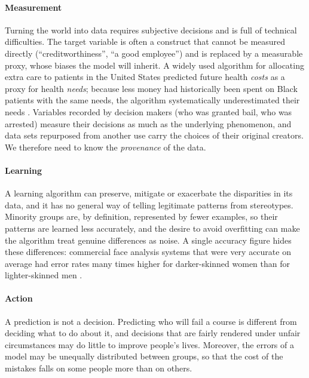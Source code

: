 \paragraph{Measurement} Turning the world into data requires subjective decisions and is full of
technical difficulties. The target variable is often a construct that cannot be measured
directly (``creditworthiness'', ``a good employee'') and is replaced by a measurable proxy,
whose biases the model will inherit. A widely used algorithm for allocating extra care to
patients in the United States predicted future health \emph{costs} as a proxy for health
\emph{needs}; because less money had historically been spent on Black patients with the same
needs, the algorithm systematically underestimated their needs \citep{obermeyer2019dissecting}.
Variables recorded by decision makers (who was granted bail, who was arrested) measure their
decisions as much as the underlying phenomenon, and data sets repurposed from another use carry
the choices of their original creators. We therefore need to know the \emph{provenance} of the data.

\paragraph{Learning} A learning algorithm can preserve, mitigate or exacerbate the disparities in
its data, and it has no general way of telling legitimate patterns from stereotypes. Minority
groups are, by definition, represented by fewer examples, so their patterns are learned less
accurately, and the desire to avoid overfitting can make the algorithm treat genuine differences
as noise. A single accuracy figure hides these differences: commercial face analysis systems
that were very accurate on average had error rates many times higher for darker-skinned women
than for lighter-skinned men \citep{buolamwini2018gender}.

\paragraph{Action} A prediction is not a decision. Predicting who will fail a course is
different from deciding what to do about it, and decisions that are fairly rendered under unfair
circumstances may do little to improve people's lives. Moreover, the errors of a model may be
unequally distributed between groups, so that the cost of the mistakes falls on some people more
than on others.


